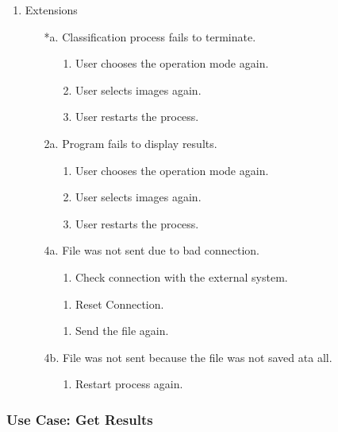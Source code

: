 \documentclass[parskip=full]{scrartcl}
\begin{document}
\begin{enumerate}
	\item Extensions
	\begin{itemize} [nosep]
		\item[*a.] Classification process fails to terminate.
		\begin{itemize} [nosep]
			\item[1.] User chooses the operation mode again.
			\item[2.] User selects images again.
			\item[3.] User restarts the process.
		\end{itemize}
		\item[2a.] Program fails to display results.
		\begin{itemize} [nosep]
			\item[1.] User chooses the operation mode again.
			\item[2.] User selects images again.
			\item[3.] User restarts the process.
		\end{itemize}
		\item[4a.] File was not sent due to bad connection.
		\begin{itemize} [nosep]
			\item[1.] Check connection with the external system.
			\item[1.] Reset Connection.
			\item[1.] Send the file again.
		\end{itemize}
		\item[4b.] File was not sent because the file was not saved ata all.
		\begin{itemize} [nosep]
			\item[1.] Restart process again.
		\end{itemize}
	\end{itemize}
\end{enumerate}

\pagebreak

\subsubsection {Use Case: Get Results}
\end{document}
